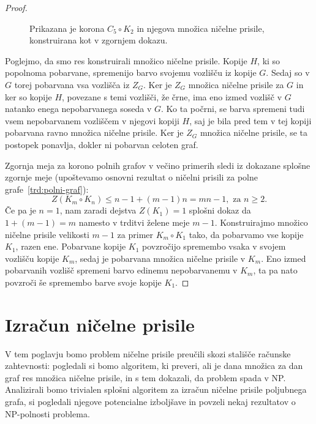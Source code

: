 \documentclass[12pt,a4paper,twoside]{article}
\theoremstyle{definition} %
\theoremstyle{plain} %
\numberwithin{equation}{section}  %
\begin{document}
\begin{proof}
\begin{figure}[h]
        \caption{Prikazana je korona $C_5 \circ K_2$ in njegova množica ničelne prisile, konstruirana kot v zgornjem dokazu.}
        \label{fig:zf-korona}
    \end{figure}
    
    Poglejmo, da smo res konstruirali množico ničelne prisile. Kopije $H$, ki so popolnoma pobarvane, spremenijo barvo svojemu vozlišču iz kopije $G$. Sedaj so v $G$ torej pobarvana vsa vozlišča iz $Z_G$. Ker je $Z_G$ množica ničelne prisile za $G$ in ker so kopije $H$, povezane s temi vozlišči, že črne, ima eno izmed vozlišč v $G$ natanko enega nepobarvanega soseda v $G$. Ko ta počrni, se barva spremeni tudi vsem nepobarvanem vozliščem v njegovi kopiji $H$, saj je bila pred tem v tej kopiji pobarvana ravno množica ničelne prisile. Ker je $Z_G$ množica ničelne prisile, se ta postopek ponavlja, dokler ni pobarvan celoten graf. 
    
    Zgornja meja za korono polnih grafov v večino primerih sledi iz dokazane splošne zgornje meje (upoštevamo osnovni rezultat o ničelni prisili za polne grafe~\ref{trd:polni-graf}):
    \[ Z(K_m \circ K_n) \leq n-1 + (m-1)n = mn - 1, \text{ za } n \geq 2.\]
    Če pa je $n = 1$, nam zaradi dejstva $Z(K_1) = 1$ splošni dokaz da $1 + (m-1) = m$ namesto v trditvi želene meje $m - 1$. Konstruirajmo množico ničelne prisile velikosti $m-1$ za primer $K_m \circ K_1$ tako, da pobarvamo vse kopije $K_1$, razen ene. Pobarvane kopije $K_1$ povzročijo spremembo vsaka v svojem vozlišču kopije $K_m$, sedaj je pobarvana množica ničelne prisile v $K_m$. Eno izmed pobarvanih vozlišč spremeni barvo edinemu nepobarvanemu v $K_m$, ta pa nato povzroči še spremembo barve svoje kopije $K_1$.
\end{proof}

\section{Izračun ničelne prisile}
V tem poglavju bomo problem ničelne prisile preučili skozi stališče računske zahtevnosti: pogledali si bomo algoritem, ki preveri, ali je dana množica za dan graf res množica ničelne prisile, in s tem dokazali, da problem spada v NP. Analizirali bomo trivialen splošni algoritem za izračun ničelne prisile poljubnega grafa, si pogledali njegove potencialne izboljšave in povzeli nekaj rezultatov o NP-polnosti problema.
\end{document}
